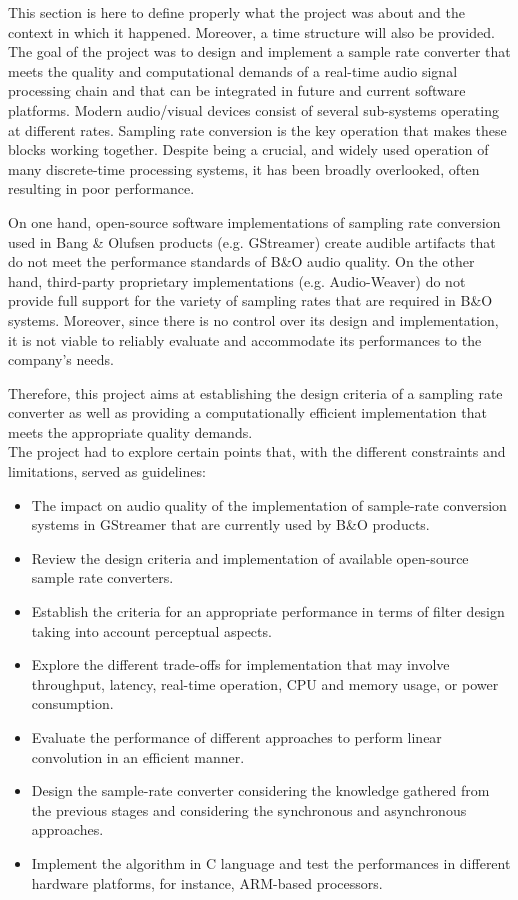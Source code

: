 This section is here to define properly what the project was about and the context in which it happened. Moreover, a time structure will also be provided.\\

The goal of the project was to design and implement a sample rate converter that meets the quality and computational demands of a real-time audio signal processing chain and that can be integrated in future and current software platforms. Modern audio/visual devices consist of several sub-systems operating at different rates. Sampling rate conversion is the key operation that makes these blocks working together. Despite being a crucial, and widely used operation of many discrete-time processing systems, it has been broadly overlooked, often resulting in poor performance. 

On one hand, open-source software implementations of sampling rate conversion used in Bang \& Olufsen products (e.g. GStreamer) create audible artifacts that do not meet the performance standards of B\&O audio quality. On the other hand, third-party proprietary implementations (e.g. Audio-Weaver) do not provide full support for the variety of sampling rates that are required in B\&O systems. Moreover, since there is no control over its design and implementation, it is not viable to reliably evaluate and accommodate its performances to the company's needs.

Therefore, this project aims at establishing the design criteria of a sampling rate converter as well as providing a computationally efficient implementation that meets the appropriate quality demands. \\

The project had to explore certain points that, with the different constraints and limitations, served as guidelines: 

\begin{itemize}
	\item The impact on audio quality of the implementation of sample-rate conversion systems in GStreamer that are currently used by B\&O products. 
	\item Review the design criteria and implementation of available open-source sample rate converters.
	\item Establish the criteria for an appropriate performance in terms of filter design taking into account perceptual aspects. 
	\item Explore the different trade-offs for implementation that may involve throughput, latency, real-time operation, CPU and memory usage, or power consumption. 
	\item Evaluate the performance of different approaches to perform linear convolution in an efficient manner.
	\item Design the sample-rate converter considering the knowledge gathered from the previous stages and considering the synchronous and asynchronous approaches.
	\item Implement the algorithm in C language and test the performances in different hardware platforms, for instance, ARM-based processors.
	
 
\end{itemize}

